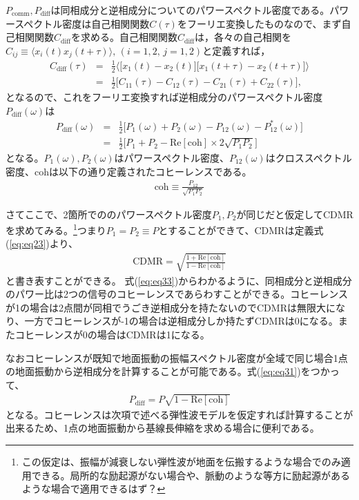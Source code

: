 \documentclass[a4paper,12pt]{jsarticle}
\begin{document}
$P_{\mathrm{comm}},P_{\mathrm{diff}}$は同相成分と逆相成分についてのパワースペクトル密度である。パワースペクトル密度は自己相関関数$C(\tau)$をフーリエ変換したものなので、まず自己相関関数$C_{\mathrm{diff}}$を求める。自己相関関数$C_{\mathrm{diff}}$は，各々の自己相関を$ C_{ij} \equiv \langle x_{i}(t)x_{j}(t+\tau)\rangle,\, (i=1,2,\,j=1,2)$と定義すれば， 
\begin{eqnarray}
  C_{\mathrm{diff}}(\tau) &=& \frac{1}{2}
  \biggl\langle
  \biggl[ x_{1}(t)-x_{2}(t) \biggr] \biggl[ x_{1}(t+\tau)-x_{2}(t+\tau) \biggr]
  \biggr\rangle \\
  &=& \frac{1}{2}\biggl[ C_{11}(\tau) - C_{12}(\tau) - C_{21}(\tau) + C_{22}(\tau) \biggr], 
\end{eqnarray}
となるので、これをフーリエ変換すれば逆相成分のパワースペクトル密度$P_{\mathrm{diff}}(\omega)$は
\begin{eqnarray}
  P_{\mathrm{diff}}(\omega) &=& \frac{1}{2}\biggl[ P_{1}(\omega) + P_{2}(\omega) - P_{12}(\omega) - P_{12}^*(\omega) \biggr]\\
  &=& \frac{1}{2} \biggl[ P_{1}+P_{2} - \mathrm{Re}\left[\mathrm{coh} \right]\times2\sqrt{P_{1}P_{2}} \biggr] \label{eq:eq31}
\end{eqnarray}
となる。$P_{1}(\omega),P_{2}(\omega)$はパワースペクトル密度、$P_{12}(\omega)$はクロススペクトル密度、$\mathrm{coh}$は以下の通り定義されたコヒーレンスである。
\begin{eqnarray}
  \mathrm{coh} \equiv \frac{P_{12}}{\sqrt{P_{1}P_{2}}}
\end{eqnarray}


さてここで、2箇所でののパワースペクトル密度$P_{1},P_{2}$が同じだと仮定してCDMRを求めてみる。\footnote[3]{この仮定は、振幅が減衰しない弾性波が地面を伝搬するような場合でのみ適用できる。局所的な励起源がない場合や、脈動のような等方に励起源があるような場合で適用できるはず？}つまり$P_{1}=P_{2}\equiv P$とすることができて、$\mathrm{CDMR}$は定義式(\ref{eq:eq23})より、
\begin{eqnarray}
 \mathrm{CDMR} = \sqrt{\frac{1 + \mathrm{Re} \left[\mathrm{coh} \right] }{1 - \mathrm{Re} \left[\mathrm{coh} \right]}} \label{eq:eq33}
\end{eqnarray}
と書き表すことができる。
式(\ref{eq:eq33})からわかるように、同相成分と逆相成分のパワー比は2つの信号のコヒーレンスであらわすことができる。コヒーレンスが1の場合は2点間が同相でうごき逆相成分を持たないのでCDMRは無限大になり、一方でコヒーレンスが-1の場合は逆相成分しか持たずCDMRは0になる。またコヒーレンスが0の場合はCDMRは1になる。

なおコヒーレンスが既知で地面振動の振幅スペクトル密度が全域で同じ場合1点の地面振動から逆相成分を計算することが可能である。式(\ref{eq:eq31})をつかって、
\begin{eqnarray}
  P_\mathrm{diff} = P \sqrt{1 - \mathrm{Re[coh]}} \label{eq:eq34}
\end{eqnarray}
となる。コヒーレンスは次項で述べる弾性波モデルを仮定すれば計算することが出来るため、1点の地面振動から基線長伸縮を求める場合に便利である。
\end{document}
